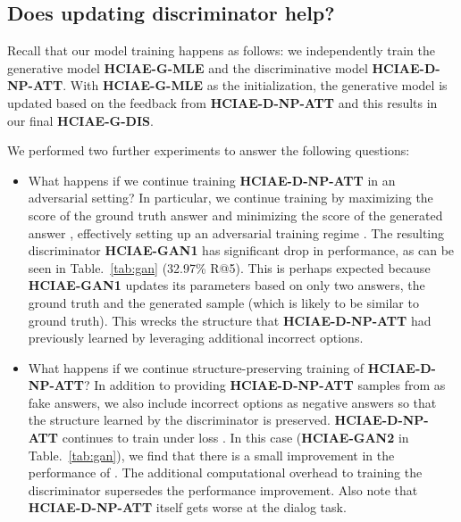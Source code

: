 \documentclass{article}
\newcommand{\ourenc}{HCIAE\xspace}
\begin{document}
\subsection{Does updating discriminator help?}


Recall that our model training happens as follows: we independently train the generative model \textbf{\ourenc-G-MLE} 
and the discriminative model \textbf{\ourenc-D-NP-ATT}. With \textbf{\ourenc-G-MLE} as the initialization, 
the generative model is updated based on the feedback from \textbf{\ourenc-D-NP-ATT} and this results in our final \textbf{\ourenc-G-DIS}. 

We performed two further experiments to answer the following questions:
\begin{itemize}
\item What happens if we continue training \textbf{\ourenc-D-NP-ATT} in an adversarial setting? 
In particular, we continue training by maximizing the score of the ground truth answer 
and minimizing the score 
of the generated answer , effectively setting up an adversarial training regime 
. The resulting 
discriminator \textbf{\ourenc-GAN1} has significant drop in performance, as can be seen in 
Table.~\ref{tab:gan} (32.97\% R@5). This is perhaps expected because \textbf{\ourenc-GAN1} 
updates its parameters based on only two answers, the ground truth and the generated 
sample (which is likely to be similar to ground truth). This wrecks the structure that 
\textbf{\ourenc-D-NP-ATT} had previously learned by leveraging additional incorrect options.

\item What happens if we continue structure-preserving training of \textbf{\ourenc-D-NP-ATT}? 
In addition to providing \textbf{\ourenc-D-NP-ATT} samples from  as fake answers, we also include 
incorrect options as negative answers so that the structure learned by the discriminator 
is preserved. \textbf{\ourenc-D-NP-ATT} continues to train under loss .  
In this case (\textbf{\ourenc-GAN2} in  Table.~\ref{tab:gan}), we find that there is a small 
improvement in the performance of . The additional computational overhead to training 
the discriminator supersedes the performance improvement. Also note that \textbf{\ourenc-D-NP-ATT} 
itself gets worse at the dialog task. 
\end{itemize}
\end{document}
